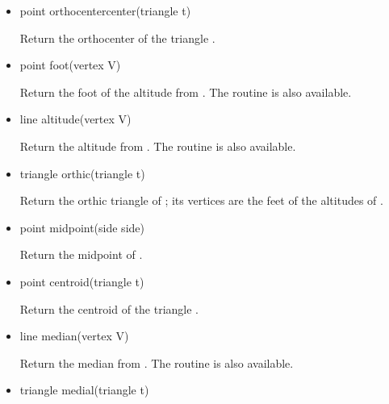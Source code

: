 \documentclass[pdftex]{article}
\begin{document}
\begin{itemize}
\item {}
  \begin{Vcolor}
    point orthocentercenter(triangle t)
  \end{Vcolor}
  Return the orthocenter of the triangle .
\item {}
  \begin{Vcolor}
    point foot(vertex V)
  \end{Vcolor}
  Return the foot of the altitude from . The routine
   is also available.
\item {}
  \begin{Vcolor}
    line altitude(vertex V)
  \end{Vcolor}
  Return the altitude from . The routine     is also available.
\item {}
  \begin{Vcolor}
    triangle orthic(triangle t)
  \end{Vcolor}
  Return the orthic triangle of ; its vertices are the feet
  of the altitudes of .
\item {}
  \begin{Vcolor}
    point midpoint(side side)
  \end{Vcolor}
  Return the midpoint of .
\item {}
  \begin{Vcolor}
    point centroid(triangle t)
  \end{Vcolor}
  Return the centroid of the triangle .
\item {}
  \begin{Vcolor}
    line median(vertex V)
  \end{Vcolor}
  Return the median from . The routine  is also available.
\item {}
  \begin{Vcolor}
    triangle medial(triangle t)
  \end{Vcolor}

\end{itemize}
\end{document}
